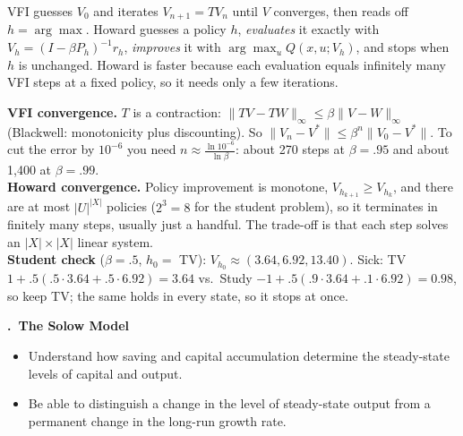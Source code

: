 \documentclass[11pt]{article}
\newcounter{qn}
\newcommand{\question}[1]{\par\needspace{14\baselineskip}\refstepcounter{qn}\medskip
{\bfseries\color{ink}\large \theqn.\ #1}\par\smallskip}
\begin{document}
\begin{resp}
VFI guesses $V_0$ and iterates $V_{n+1}=TV_n$ until $V$ converges, then reads off $h=\arg\max$. Howard guesses a policy $h$, \emph{evaluates} it exactly with $V_h=(I-\beta P_h)^{-1}r_h$, \emph{improves} it with $\arg\max_u Q(x,u;V_h)$, and stops when $h$ is unchanged. Howard is faster because each evaluation equals infinitely many VFI steps at a fixed policy, so it needs only a few iterations.
\end{resp}
\begin{intu}
\textbf{VFI convergence.} $T$ is a contraction: $\|TV-TW\|_\infty\le\beta\|V-W\|_\infty$ (Blackwell: monotonicity plus discounting). So $\|V_n-V^*\|\le\beta^n\|V_0-V^*\|$. To cut the error by $10^{-6}$ you need $n\approx\frac{\ln10^{-6}}{\ln\beta}$: about 270 steps at $\beta=.95$ and about 1{,}400 at $\beta=.99$.\\
\textbf{Howard convergence.} Policy improvement is monotone, $V_{h_{k+1}}\ge V_{h_k}$, and there are at most $|U|^{|X|}$ policies ($2^3=8$ for the student problem), so it terminates in finitely many steps, usually just a handful. The trade-off is that each step solves an $|X|\times|X|$ linear system.\\
\textbf{Student check} ($\beta=.5$, $h_0=$ TV): $V_{h_0}\approx(3.64,6.92,13.40)$. Sick: TV $1+.5(.5\cdot3.64+.5\cdot6.92)=3.64$ vs.\ Study $-1+.5(.9\cdot3.64+.1\cdot6.92)=0.98$, so keep TV; the same holds in every state, so it stops at once.
\end{intu}

\question{The Solow Model}
\begin{itemize}[leftmargin=1.2em,itemsep=0pt]\itshape
\item Understand how saving and capital accumulation determine the steady-state levels of capital and output.
\item Be able to distinguish a change in the level of steady-state output from a permanent change in the long-run growth rate.
\end{itemize}
\end{document}
